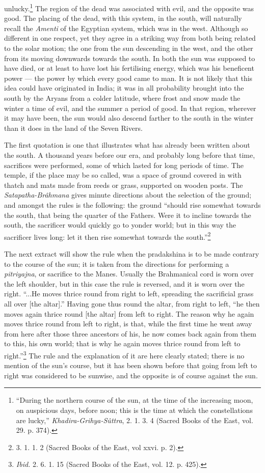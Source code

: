 \documentclass[a4paper, 11pt, oneside, polutonikogreek, english]{article}
\begin{document}
unlucky.\footnote{``During the northern course of the sun, at the time of the increasing moon, on auspicious days, before noon; this is the time at which the constellations are lucky,'' \emph{Khadira-Grihya-Sûttra}, 2. 1. 3. 4 (Sacred Books of the East, vol. 29. p. 374).} The region of the dead was associated with evil, and the opposite was good. The placing of the dead, with this system, in the south, will naturally recall the \emph{Amenti} of the Egyptian system, which was in the west. Although so different in one respect, yet they agree in a striking way from both being related to the solar motion; the one from the sun descending in the west, and the other from its moving downwards towards the south. In both the sun was supposed to have died, or at least to have lost his fertilising energy, which was his beneficent power --- the power by which every good came to man. It is not likely that this idea could have originated in India; it was in all probability brought into the south by the Aryans from a colder latitude, where frost and snow made the winter a time of evil, and the summer a period of good. In that region, wherever it may have been, the sun would also descend farther to the south in the winter than it does in the land of the Seven Rivers.

The first quotation is one that illustrates what has already been written about the south. A thousand years before our era, and probably long before that time, sacrifices were performed, some of which lasted for long periods of time. The temple, if the place may be so called, was a space of ground covered in with thatch and mats made from reeds or grass, supported on wooden posts. The \emph{Satapatha-Brâhmana} gives minute directions about the selection of the ground; and amongst the rules is the following: the ground ``should rise somewhat towards the south, that being the quarter of the Fathers. Were it to incline towards the south, the sacrificer would quickly go to yonder world; but in this way the sacrificer lives long: let it then rise somewhat towards the south.''\footnote{3. 1. 1. 2 (Sacred Books of the East, vol xxvi. p. 2).}

The next extract will show the rule when the pradakshina is to be made contrary to the course of the sun; it is taken from the directions for performing a \emph{pitriyajna}, or sacrifice to the Manes. Usually the Brahmanical cord is worn over the left shoulder, but in this case the rule is reversed, and it is worn over the right. ``...He moves thrice round from right to left, spreading the sacrificial grass all over [the altar].'' Having gone thus round the altar, from right to left, ``he then moves again thrice round [the altar] from left to right. The reason why he again moves thrice round from left to right, is that, while the first time he went away from here after those three ancestors of his, he now comes back again from them to this, his own world; that is why he again moves thrice round from left to right.''\footnote{\emph{Ibid.} 2. 6. 1. 15 (Sacred Books of the East, vol. 12. p. 425).} The rule and the explanation of it are here clearly stated; there is no mention of the sun's course, but it has been shown before that going from left to right was considered to be sunwise, and the opposite is of course against the sun.
\end{document}
